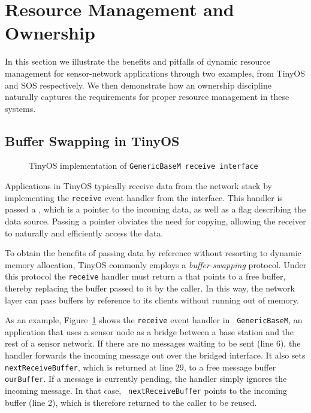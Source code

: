 \section{Resource Management and Ownership}
\label{sec:example}

In this section we illustrate the benefits and pitfalls of dynamic
resource management for sensor-network applications through two
examples, from TinyOS and SOS respectively.  We then demonstrate how
an ownership discipline naturally captures the requirements for proper
resource management in these systems.

\subsection{Buffer Swapping in TinyOS}

\begin{figure}[t]

\caption{TinyOS implementation of {\tt GenericBaseM receive
interface}\label{fig:genericbase}}
\end{figure}

Applications in TinyOS typically receive data from the network stack
by implementing the {\tt receive} event handler from the
 interface.  This handler is passed a
, which is a pointer to the incoming data, as well
as a flag describing the data source.  Passing a pointer 
obviates the need for copying, 
allowing the receiver to naturally and efficiently access the data.

To obtain the benefits of passing data by reference without resorting
to dynamic memory allocation, TinyOS commonly
employs a {\em buffer-swapping} protocol.  Under this protocol the
{\tt receive} handler must return a  that points to
a free buffer, thereby replacing the buffer passed to it by the caller.
In this way, the network layer can pass buffers by reference to its
clients without running out of memory.

As an example, 
Figure~\ref{fig:genericbase} shows 
the {\tt receive} event handler in {\tt
GenericBaseM}, an application that uses a sensor node as a bridge
between a base station and the rest of a sensor network.  
If there are no messages waiting to be sent (line 6), the handler
forwards the incoming message out over the bridged interface.  It also sets
{\tt nextReceiveBuffer}, which is returned at line 29, to a free
message buffer {\tt ourBuffer}.  If a message is currently pending,
the handler simply ignores the incoming message.  In that case, {\tt
  nextReceiveBuffer} points to the incoming buffer (line 2), which
is therefore returned to the caller to be reused.

